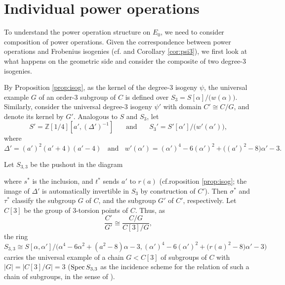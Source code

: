 \documentclass{gtpart}
\theoremstyle{definition}
\theoremstyle{remark}
\newcommand{\mb}[1]{\mathbb{#1}}
\newcommand{\Spec}{{\rm Spec\thinspace}}
\newcommand{\cff}[2]{cf.\thinspace{\cite[#1]{#2}}}
\newcommand{\BZ}{{\mb Z}}
\newcommand{\A}{\alpha}
\begin{document}
\section{Individual power operations}
\label{sec:Gamma}

To understand the power operation structure on $E_0$, 
we need to consider composition of power operations.  
Given the correspondence between power operations and Frobenius isogenies (\cff{Theorem B}{cong} and Corollary \ref{cor:psi3}), 
we first look at what happens on the geometric side and consider the composite of two degree-3 isogenies.  

By Proposition \ref{prop:isog}, as the kernel of the degree-3 isogeny $\psi$, 
the universal example $G$ of an order-3 subgroup of $C$ is defined over 
$S_3 = S[\A] \big/ \big( w(\A) \big)$.  
Similarly, consider the universal degree-3 isogeny $\psi'$ with domain 
$C' \cong C/G$, and denote its kernel by $G'$.  
Analogous to $S$ and $S_3$, let 
\begin{equation}
\label{w'}
 S' = \BZ [1/4] [a', (\Delta')^{-1}]~~~~~~~~\text{and}~~~~~~~~S_3' = S'[\A'] \big/ \big( w'(\A') \big), 
\end{equation}
where 
\[
 \Delta' = (a')^2 (a' + 4) (a' - 4)~~~~\text{and}~~~~w'(\A') = (\A')^4 - 6 (\A')^2 + \big( (a')^2 - 8 \big) \A' - 3.  
\]

Let $S_{3,3}$ be the pushout in the diagram 
\begin{center}
\end{center}
where $s^*$ is the inclusion, and $t^*$ sends $a'$ to $r(a)$ (cf.roposition \ref{prop:isog}; 
the image of $\Delta'$ is automatically invertible in $S_3$ by construction of $C'$).  
Then $\sigma^*$ and $\tau^*$ classify the subgroup $G$ of $C$, and the subgroup $G'$ of $C'$, respectively.  Let $C[3]$ be the group of 3-torsion points of $C$.  
Thus, as 
\[
 \frac{C'}{G'} \cong \frac{C/G}{C[3]/G}, 
\]
the ring 
\[
 S_{3,3} \cong S[\A,\A'] \Big/ \Big( \A^4 - 6 \A^2 + (a^2 - 8) \A - 3, (\A')^4 - 6 (\A')^2 + \big( r(a)^2 - 8 \big) \A' - 3 \Big) 
\]
carries the universal example of a chain $G < C[3]$ of subgroups of $C$ with $|G| = |C[3]/G| = 3$ 
($\Spec S_{3,3}$ as the incidence scheme for the relation of such a chain of subgroups, in the sense of \cite[Section 1.3]{katzmazur}).  
\end{document}
